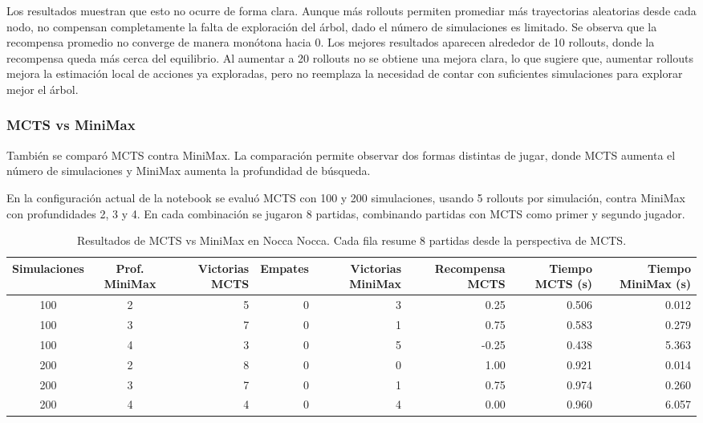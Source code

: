 \documentclass[letterpaper,12pt]{article}
\begin{document}
Los resultados muestran que esto no ocurre de forma clara. 
Aunque más rollouts permiten promediar más trayectorias aleatorias desde cada nodo, no compensan completamente la falta de exploración del árbol, dado el número de simulaciones es limitado. 
Se observa que la recompensa promedio no converge de manera monótona hacia 0. Los mejores resultados aparecen alrededor de 10 rollouts, donde la recompensa queda más cerca del equilibrio. 
Al aumentar a 20 rollouts no se obtiene una mejora clara, lo que sugiere que, aumentar rollouts mejora la estimación local de acciones ya exploradas, pero no reemplaza la necesidad de contar con suficientes simulaciones para explorar mejor el árbol.



\subsubsection*{MCTS vs MiniMax}

También se comparó MCTS contra MiniMax. La comparación permite observar dos formas distintas de jugar, donde MCTS aumenta el número de simulaciones y  MiniMax aumenta la profundidad de búsqueda.

En la configuración actual de la notebook se evaluó MCTS con 100 y 200 simulaciones, usando 5 rollouts por simulación, contra MiniMax con profundidades 2, 3 y 4. En cada combinación se jugaron 8 partidas, combinando partidas con MCTS como primer y segundo jugador.

\begin{table}[H]
    \centering
    \begin{adjustbox}{max width=\textwidth}
    \begin{tabular}{cc|rrrr|rr}
        \toprule
        Simulaciones & Prof. MiniMax & Victorias MCTS & Empates & Victorias MiniMax & Recompensa MCTS & Tiempo MCTS (s) & Tiempo MiniMax (s) \\
        \midrule
        100 & 2 & 5 & 0 & 3 & 0.25 & 0.506 & 0.012 \\
        100 & 3 & 7 & 0 & 1 & 0.75 & 0.583 & 0.279 \\
        100 & 4 & 3 & 0 & 5 & -0.25 & 0.438 & 5.363 \\
        200 & 2 & 8 & 0 & 0 & 1.00 & 0.921 & 0.014 \\
        200 & 3 & 7 & 0 & 1 & 0.75 & 0.974 & 0.260 \\
        200 & 4 & 4 & 0 & 4 & 0.00 & 0.960 & 6.057 \\
        \bottomrule
    \end{tabular}
    \end{adjustbox}
    \caption{Resultados de MCTS vs MiniMax en Nocca Nocca. Cada fila resume 8 partidas desde la perspectiva de MCTS.}
    \label{tab:nocca-mcts-minimax}
\end{table}
\end{document}
